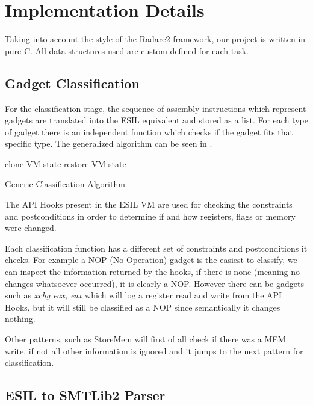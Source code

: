 \chapter{Implementation Details}
\label{chapter:implementation}

Taking into account the style of the Radare2 framework, our project is written in pure C. All data structures used are custom defined for each task.

\section{Gadget Classification}

For the classification stage, the sequence of assembly instructions which represent gadgets are translated into the ESIL equivalent and stored as a list. For each type of gadget there is an independent function which checks if the gadget fits that specific type. The generalized algorithm can be seen in .


\begin{algorithm}[htp]
	clone VM state\;
	restore VM state\;
	\caption{Generic Classification Algorithm}
	\label{alg:classify}
\end{algorithm}

The API Hooks present in the ESIL VM are used for checking the constraints and postconditions in order to determine if and how registers, flags or memory were changed.

Each classification function has a different set of constraints and postconditions it checks. For example a NOP (No Operation) gadget is the easiest to classify, we can inspect the information returned by the hooks, if there is none (meaning no changes whatsoever occurred), it is clearly a NOP. However there can be gadgets such as \textit{xchg eax, eax} which will log a register read and write from the API Hooks, but it will still be classified as a NOP since semantically it changes nothing.

Other patterns, such as StoreMem will first of all check if there was a MEM write, if not all other information is ignored and it jumps to the next pattern for classification.

\section{ESIL to SMTLib2 Parser}

